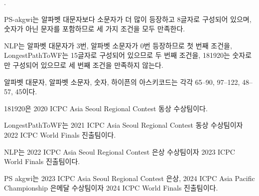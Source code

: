 \begin{problem}{\probno{}. \probtitle{}}

\Example

\begin{example}
\end{example}

PS-akgwi는 알파벳 대문자보다 소문자가 더 많이 등장하고 8글자로 구성되어 있으며, 숫자가 아닌 문자를 포함하므로 세 가지 조건을 모두 만족한다.

NLP는 알파벳 대문자가 3번, 알파벳 소문자가 0번 등장하므로 첫 번째 조건을, LongestPathToWF는 15글자로 구성되어 있으므로 두 번째 조건을, 181920는 숫자로만 구성되어 있으므로 세 번째 조건을 만족하지 않는다.



\Notes

알파벳 대문자, 알파벳 소문자, 숫자, 하이픈의 아스키코드는 각각 65--90, 97--122, 48--57, 45이다.

181920은 2020 ICPC Asia Seoul Regional Contest 동상 수상팀이다.

LongestPathToWF는 2021 ICPC Asia Seoul Regional Contest 동상 수상팀이자 2022 ICPC World Finals 진출팀이다.

NLP는 2022 ICPC Asia Seoul Regional Contest 은상 수상팀이자 2023 ICPC World Finals 진출팀이다.

PS akgwi는 2023 ICPC Asia Seoul Regional Contest 은상, 2024 ICPC Asia Pacific Championship 은메달 수상팀이자 2024 ICPC World Finals 진출팀이다.


\end{problem}